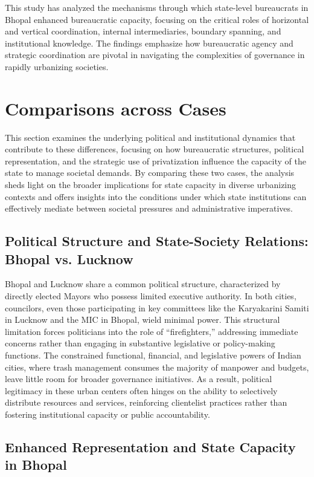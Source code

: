 This study has analyzed the mechanisms through which state-level bureaucrats in Bhopal enhanced bureaucratic capacity, focusing on the critical roles of horizontal and vertical coordination, internal intermediaries, boundary spanning, and institutional knowledge. The findings emphasize how bureaucratic agency and strategic coordination are pivotal in navigating the complexities of governance in rapidly urbanizing societies.

\section{Comparisons across Cases}

This section examines the underlying political and institutional dynamics that contribute to these differences, focusing on how bureaucratic structures, political representation, and the strategic use of privatization influence the capacity of the state to manage societal demands. By comparing these two cases, the analysis sheds light on the broader implications for state capacity in diverse urbanizing contexts and offers insights into the conditions under which state institutions can effectively mediate between societal pressures and administrative imperatives.

\subsection{Political Structure and State-Society Relations: Bhopal vs. Lucknow}

Bhopal and Lucknow share a common political structure, characterized by directly elected Mayors who possess limited executive authority. In both cities, councilors, even those participating in key committees like the Karyakarini Samiti in Lucknow and the MIC in Bhopal, wield minimal power. This structural limitation forces politicians into the role of ``firefighters,'' addressing immediate concerns rather than engaging in substantive legislative or policy-making functions. The constrained functional, financial, and legislative powers of Indian cities, where trash management consumes the majority of manpower and budgets, leave little room for broader governance initiatives. As a result, political legitimacy in these urban centers often hinges on the ability to selectively distribute resources and services, reinforcing clientelist practices rather than fostering institutional capacity or public accountability.

\subsection{Enhanced Representation and State Capacity in Bhopal}

